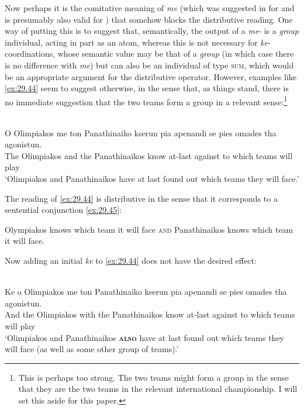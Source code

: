 \documentclass[output=paper]{langsci/langscibook}
\begin{document}
Now perhaps it is the comitative meaning of \emph{me} (which was suggested in
 for  and is presumably also valid for ) that somehow
blocks the distributive reading. One way of putting this is to suggest that,
semantically, the output of a \emph{me}- is a \emph{group}
individual, acting in part as an atom, whereas this is not necessary for
\emph{ke}-coordinations, whose semantic value may be that of a \emph{group} (in
which case there is no difference with \emph{me}) but can also be an individual
of type \textsc{sum}, which would be an appropriate argument for the distributive
operator. However, examples like \eqref{ex:29.44} seem to suggest
otherwise, in the sense that, as things stand, there is no immediate suggestion
that the two teams form a group in a relevant sense:\footnote{This is perhaps
    too strong.  The two teams might form a group in the sense that they are
    the two  teams in the relevant international championship. I
will set this aside for this paper.}

\ea\label{ex:29.44} \\
	\gll    O Olimpiakos me ton Panathinaiko kserun pia apenandi se pies omades
    tha agonistun.\\
            The Olimpiakos and the Panathinaikos know at-last against to which teams will play\\
    \glt    \enquote*{Olimpiakos and Panathinaikos have at last found out which
    teams they will face.}
\z

The reading of \eqref{ex:29.44} is distributive in the sense that it
corresponds to a sentential conjunction \eqref{ex:29.45}:

\ea\label{ex:29.45}
    Olympiakos knows which team it will face \textsc{and} Panathinaikos knows which team
    it will face.
\z

Now adding an initial \emph{ke} to \eqref{ex:29.44} does not have the
desired effect:

\ea\label{ex:29.46} \\
	\gll    Ke o Olimpiakos me ton Panathinaiko kserun pia apenandi se pies
    omades tha agonistun.\\
            And the Olimpiakos with the Panathinaikos know at-last against to which teams will play\\
    \glt    \enquote*{Olimpiakos and Panathinaikos \textbf{\textsc{also}} have at last
    found out which teams they will face (as well as some other group of
teams).}
\z
\end{document}

